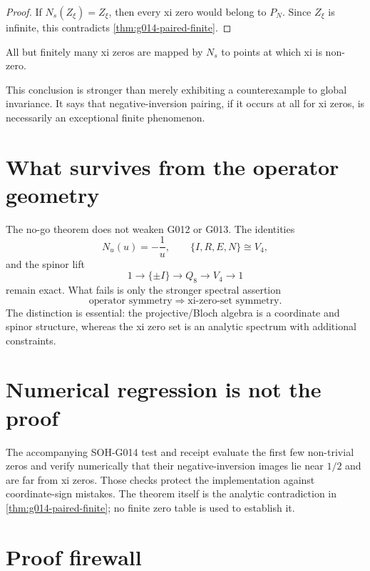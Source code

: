 \begin{proof}
If $N_s(Z_\xi)=Z_\xi$, then every xi zero would belong to $P_N$.  Since
$Z_\xi$ is infinite, this contradicts \cref{thm:g014-paired-finite}.
\end{proof}

\begin{corollary}
\label{cor:g014-cofinite-failure}
All but finitely many xi zeros are mapped by $N_s$ to points at which xi is
non-zero.
\end{corollary}

This conclusion is stronger than merely exhibiting a counterexample to global
invariance.  It says that negative-inversion pairing, if it occurs at all for
xi zeros, is necessarily an exceptional finite phenomenon.

\section{What survives from the operator geometry}

The no-go theorem does not weaken G012 or G013.  The identities
\[
 N_u(u)=-\frac1u,
 \qquad
 \{I,R,E,N\}\cong V_4,
\]
and the spinor lift
\[
 1\longrightarrow\{\pm I\}
 \longrightarrow Q_8
 \longrightarrow V_4
 \longrightarrow1
\]
remain exact.  What fails is only the stronger spectral assertion
\[
 \text{operator symmetry}\Longrightarrow\text{xi-zero-set symmetry}.
\]
The distinction is essential: the projective/Bloch algebra is a coordinate
and spinor structure, whereas the xi zero set is an analytic spectrum with
additional constraints.

\section{Numerical regression is not the proof}

The accompanying SOH-G014 test and receipt evaluate the first few
non-trivial zeros and verify numerically that their negative-inversion images
lie near $1/2$ and are far from xi zeros.  Those checks protect the
implementation against coordinate-sign mistakes.  The theorem itself is the
analytic contradiction in \cref{thm:g014-paired-finite}; no finite zero table
is used to establish it.

\section{Proof firewall}

